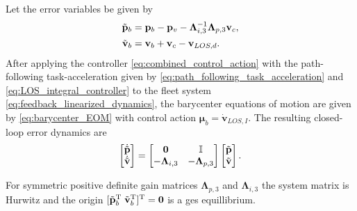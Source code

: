 Let the error variables be given by
\begin{subequations}\label{eq:LOS_integral_errors}
 \begin{align}
     \Tilde{\mathbf{p}}_b &= \mathbf{p}_b-\mathbf{p}_v - \bm{\Lambda}_{i,3}^{-1}\bm{\Lambda}_{p,3} \mathbf{v}_c,\\
     \Tilde{\mathbf{v}}_b &= \mathbf{v}_b + \mathbf{v}_c - \mathbf{v}_{LOS,d}.
 \end{align}
\end{subequations}
After applying the controller \eqref{eq:combined_control_action} with the path-following task-acceleration given by \eqref{eq:path_following_task_acceleration} and \eqref{eq:LOS_integral_controller} to the fleet system \eqref{eq:feedback_linearized_dynamics}, the barycenter equations of motion are given by \eqref{eq:barycenter_EOM} with control action $\bm{\mu}_b = \dot{\mathbf{v}}_{LOS,I}$. The resulting closed-loop error dynamics are
\begin{equation}\label{eq:integral_closed_loop}
    \begin{bmatrix}
        \dot{\Tilde{\mathbf{p}}} \\ \dot{\Tilde{\mathbf{v}}}
    \end{bmatrix} = \begin{bmatrix}
        \mathbf{0} & \mathbb{I}\\
        -\mathbf{\Lambda}_{i,3} & -\mathbf{\Lambda}_{p,3}
    \end{bmatrix}\begin{bmatrix}
        \Tilde{\mathbf{p}} \\ \Tilde{\mathbf{v}}
    \end{bmatrix}.
\end{equation}

For symmetric positive definite gain matrices $\bm{\Lambda}_{p,3}$ and $\bm{\Lambda}_{i,3}$ the system matrix is Hurwitz and the origin $[\Tilde{\mathbf{p}}_b^{\rm T} \; \Tilde{\mathbf{v}}_b^{\rm T}]^{\rm T} = \mathbf{0}$ is a \gls{ges} equillibrium.


